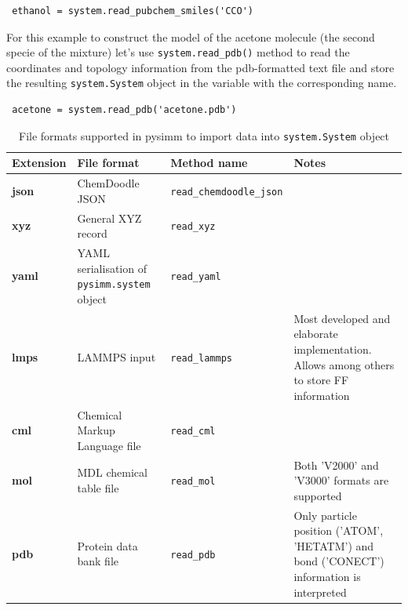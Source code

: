 \documentclass[9pt,tutorial]{livecoms}
\begin{document}
\begin{lstlisting}
 ethanol = system.read_pubchem_smiles('CCO')
\end{lstlisting}
For this example to construct the model of the acetone molecule (the second specie of the mixture) let's use \lstinline$system.read_pdb()$ method to read the coordinates and topology information from the pdb-formatted text file and store the resulting \lstinline$system.System$ object in the variable with the corresponding name.

\begin{lstlisting}
 acetone = system.read_pdb('acetone.pdb')
\end{lstlisting}


\begin{table}[bt!]
\caption{\label{tab:file_formats}File formats supported in pysimm to import data into \lstinline$system.System$ object}

\begin{tabular}{p{}p{}p{}p{}}
\toprule
Extension        & File format                      & Method name                                    & Notes        \\
\midrule
\textbf{json}    & ChemDoodle JSON                  & \lstinline$read_chemdoodle_json$          &               \\
\textbf{xyz}     & General XYZ record               & \lstinline$read_xyz$                      &               \\
\textbf{yaml}    & YAML serialisation of \lstinline$pysimm.system$ object    & \lstinline$read_yaml$                      &               \\
\textbf{lmps}    & LAMMPS input                 & \lstinline$read_lammps$            & Most developed and elaborate implementation. Allows among others to store FF information     \\
\textbf{cml}     & Chemical Markup Language file    & \lstinline$read_cml$           &      \\
\textbf{mol}     & MDL chemical table file          & \lstinline$read_mol$           &  Both 'V2000' and 'V3000' formats are supported \\
\textbf{pdb}     & Protein data bank file           & \lstinline$read_pdb$           &  Only particle position ('ATOM', 'HETATM') and bond ('CONECT') information is interpreted\\

\bottomrule
\end{tabular}
\medskip
\end{table}
\end{document}

